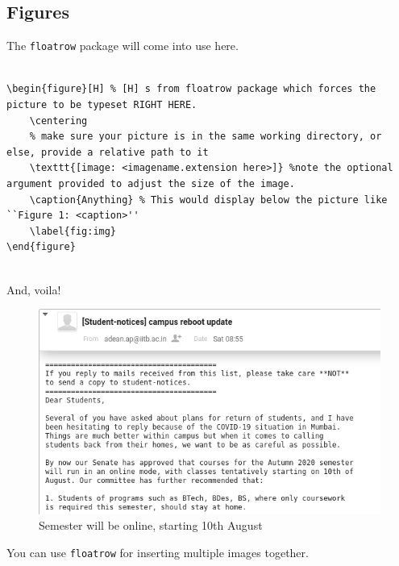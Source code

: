 \documentclass[12pt, letterpaper]{article}
\theoremstyle{remark}
\begin{document}
    \subsection{Figures}
    The \verb!floatrow! package will come into use here.
\begin{lstlisting}

\begin{figure}[H] % [H] s from floatrow package which forces the picture to be typeset RIGHT HERE.
    \centering
    % make sure your picture is in the same working directory, or else, provide a relative path to it
    \texttt{[image: <imagename.extension here>]} %note the optional argument provided to adjust the size of the image.
    \caption{Anything} % This would display below the picture like ``Figure 1: <caption>''
    \label{fig:img}
\end{figure}
    
\end{lstlisting}

\clearpage
    And, voila! 
    \begin{figure}[H]
        \centering
        \includegraphics[width=0.6\linewidth]{Proof_of_online_semester.png} 
        \caption{Semester will be online, starting 10th August}
        \label{fig:img}
    \end{figure}

You can use \verb!floatrow! for inserting multiple images together.
\end{document}
